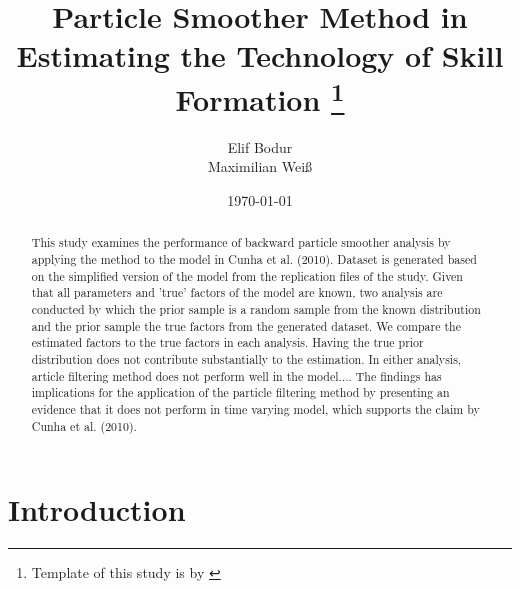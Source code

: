 \documentclass[11pt, a4paper, leqno]{article}
\begin{document}
\title{Particle Smoother Method in Estimating the Technology of Skill Formation  \thanks{Template of this study is by \citep{GaudeckerEconProjectTemplates}}}

\author{Elif Bodur \\ Maximilian Weiß}

\date{
\today
}

\maketitle


\begin{abstract}
	This study examines the performance of backward particle smoother analysis by applying the method to the model in Cunha et al. (2010). \nocite{cunha2010} Dataset is generated based on the simplified version of the model from the replication files of the study. Given that all parameters and 'true'  factors of the model are known, two analysis are conducted by which the prior sample is a random sample from the known distribution and the prior sample the true factors from the generated dataset. We compare the estimated factors to the true factors in each analysis. Having the true prior distribution does not contribute substantially to the estimation. In either analysis, article filtering method does not perform well in the model.... The findings has implications for the application of the particle filtering method by presenting an evidence that it does not perform in time varying model, which supports the claim by Cunha et al. (2010). \nocite{cunha2010}
\end{abstract}
\clearpage

\section{Introduction} %
\label{sec:introduction}



 \citet{GaudeckerEconProjectTemplates}








\clearpage







\end{document}
